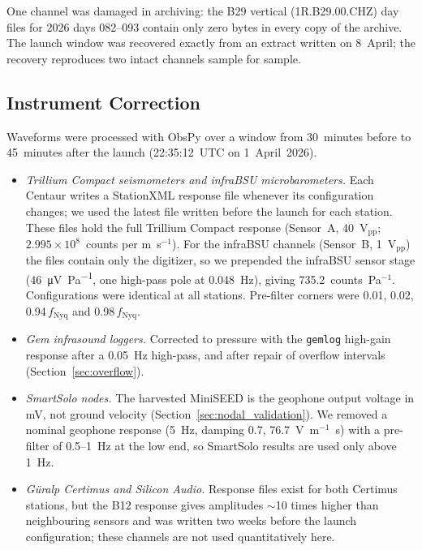 \documentclass[]{seismica}
\begin{document}
One channel was damaged in archiving: the B29 vertical (1R.B29.00.CHZ)
day files for 2026 days 082--093 contain only zero bytes in every copy
of the archive. The launch window was recovered exactly from an extract
written on 8~April; the recovery reproduces two intact channels sample
for sample.

\subsection{Instrument Correction}
\label{sec:response}

Waveforms were processed with ObsPy \citep{Beyreuther2010} over a window
from 30~minutes before to 45~minutes after the launch (22:35:12~UTC on
1~April~2026).

\begin{itemize}
  \item \textit{Trillium Compact seismometers and infraBSU
    microbarometers.} Each Centaur writes a StationXML response file
    whenever its configuration changes; we used the latest file written
    before the launch for each station. These files hold the full
    Trillium Compact response (Sensor~A, 40~V$_\text{pp}$;
    $2.995\times10^{8}$~counts per m~s$^{-1}$). For the infraBSU
    channels (Sensor~B, 1~V$_\text{pp}$) the files contain only the
    digitizer, so we prepended the infraBSU sensor stage
    (\SI{46}{\micro\volt\per\pascal}, one high-pass pole at 0.048~Hz),
    giving 735.2~counts~Pa$^{-1}$. Configurations were identical at all
    stations. Pre-filter corners were 0.01, 0.02,
    0.94\,$f_\text{Nyq}$ and 0.98\,$f_\text{Nyq}$.
  \item \textit{Gem infrasound loggers.} Corrected to pressure with the
    \texttt{gemlog} high-gain response after a 0.05~Hz high-pass, and
    after repair of overflow intervals (Section~\ref{sec:overflow}).
  \item \textit{SmartSolo nodes.} The harvested MiniSEED is the
    geophone output voltage in mV, not ground velocity
    (Section~\ref{sec:nodal_validation}). We removed a nominal geophone
    response (5~Hz, damping 0.7, 76.7~V~m$^{-1}$~s) with a pre-filter
    of 0.5--1~Hz at the low end, so SmartSolo results are used only
    above 1~Hz.
  \item \textit{G\"{u}ralp Certimus and Silicon Audio.} Response files
    exist for both Certimus stations, but the B12 response gives
    amplitudes $\sim$10 times higher than neighbouring sensors and was
    written two weeks before the launch configuration; these channels
    are not used quantitatively here.
\end{itemize}
\end{document}
